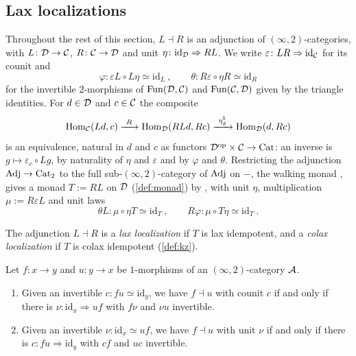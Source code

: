 \subsection{Lax localizations}
\label{subsec:laxloc-def}

%
Throughout the rest of this section, $L \dashv R$ is an adjunction of
$(\infty,2)$-categories, with
$L\colon \mathcal{D} \to \mathcal{C}$,
$R\colon \mathcal{C} \to \mathcal{D}$
and unit
$\eta\colon \mathrm{id}_{\mathcal{D}} \Rightarrow RL$.
We write
$\varepsilon\colon LR \Rightarrow \mathrm{id}_{\mathcal{C}}$
for its counit and
\begin{equation*}
\varphi\colon \varepsilon L \circ L\eta \simeq \mathrm{id}_{L} \ , \qquad
\theta\colon R\varepsilon \circ \eta R \simeq \mathrm{id}_{R}
\end{equation*}
for the invertible $2$-morphisms of $\operatorname{Fun}(\mathcal{D},\mathcal{C})$ and $\operatorname{Fun}(\mathcal{C},\mathcal{D})$ given by
the triangle identities.
For $d \in \mathcal{D}$ and $c \in \mathcal{C}$ the composite
\begin{equation}
\label{eq:laxloc-adjunction}
\operatorname{Hom}_{\mathcal{C}}(Ld,c) \xrightarrow{\ R\ } \operatorname{Hom}_{\mathcal{D}}(RLd,Rc)
\xrightarrow{\ \eta_{d}^{\natural}\ } \operatorname{Hom}_{\mathcal{D}}(d,Rc)
\end{equation}
is an equivalence, natural in $d$ and $c$ as functors
$\mathcal{D}^{\mathrm{op}} \times \mathcal{C} \to \mathrm{Cat}$:
an inverse is
$g \mapsto \varepsilon_{c} \circ Lg$,
by naturality of $\eta$ and
$\varepsilon$ and by $\varphi$ and $\theta$.
Restricting the adjunction
$\mathrm{Adj} \to \mathrm{Cat}_{2}$
to the full sub-$(\infty,2)$-category of $\mathrm{Adj}$ on $-$, the walking monad
\cite[Not.~5.1]{haugseng2021laxmonads}, gives a monad $T := RL$ on $\mathcal{D}$
(\cref{def:monad}) by \cite[Cor.~8.9]{haugseng2021laxmonads}, with unit
$\eta$, multiplication
$\mu := R\varepsilon L$
and unit laws
\begin{equation*}
\theta L\colon \mu \circ \eta T \simeq \mathrm{id}_{T} \ , \qquad
R\varphi\colon \mu \circ T\eta \simeq \mathrm{id}_{T} \ .
\end{equation*}

\begin{defi}
\label{def:laxloc}
%
The adjunction $L \dashv R$ is a \emph{lax localization} if $T$ is lax
idempotent, and a \emph{colax localization} if $T$ is colax idempotent
(\cref{def:kz}).
\end{defi}

\begin{lem}
\label{lem:laxloc-criterion}
%
Let $f\colon x \to y$ and $u\colon y \to x$ be $1$-morphisms of an
$(\infty,2)$-category $\mathcal{A}$.
\begin{enumerate}
\item Given an invertible
$c\colon fu \simeq \mathrm{id}_{y}$,
we have $f \dashv u$ with counit $c$ if and only if there is
$\nu\colon \mathrm{id}_{x} \Rightarrow uf$
with $f\nu$ and $\nu u$ invertible.
\item Given an invertible
$\nu\colon \mathrm{id}_{x} \simeq uf$,
we have $f \dashv u$ with unit $\nu$ if and only if there is
$c\colon fu \Rightarrow \mathrm{id}_{y}$
with $cf$ and $uc$ invertible.
\end{enumerate}
\end{lem}

